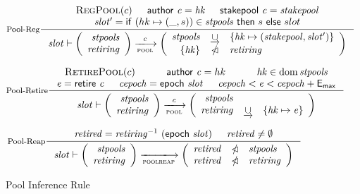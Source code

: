 \begin{figure}
  \begin{equation}\label{eq:pool-reg}
    \inference[Pool-Reg]
    {
      \RegPool{c}
      & \cauthor{c} = \var{hk}
      & \stakepool{c} = \var{stakepool}
      \\
      \var{slot'} = \mathsf{if}~(hk \mapsto (\_, s))\in\var{stpools}
                    ~\mathsf{then}~ s
                    ~\mathsf{else}~ slot
    }
    {
      \var{slot} \vdash
      \left(
      \begin{array}{r}
        \var{stpools} \\
        \var{retiring}
      \end{array}
      \right)
      \trans{pool}{c}
      \left(
      \begin{array}{rcl}
        \var{stpools} & \unionoverride
                      & \{\var{hk} \mapsto \var{(stakepool, slot')}\} \\
        \{\var{hk}\} & \subtractdom & \var{retiring} \\
      \end{array}
      \right)
    }
  \end{equation}


  \begin{equation}\label{eq:pool-ret}
    \inference[Pool-Retire]
    {
    \RetirePool{c}
    & \cauthor{c} = hk
    & \var{hk} \in \dom \var{stpools} \\
    \var{e} = \retire{c}
    & \var{cepoch} = \epoch{slot}
    & \var{cepoch} < \var{e} < \var{cepoch} + \emax
  }
  {
    \var{slot} \vdash
    \left(
      \begin{array}{r}
        \var{stpools} \\
        \var{retiring}
      \end{array}
    \right)
    \trans{pool}{c}
    \left(
      \begin{array}{rcl}
        \var{stpools} \\
        \var{retiring} & \unionoverride & \{\var{hk} \mapsto \var{e}\} \\
      \end{array}
    \right)
  }
  \end{equation}

  \begin{equation}\label{eq:pool-reap}
    \inference[Pool-Reap]
    {
      \var{retired} = \var{retiring}^{-1}~\var{(\epoch{slot})}
      & \var{retired} \neq \emptyset
    }
    {
      \var{slot} \vdash
      \left(
      \begin{array}{r}
        \var{stpools} \\
        \var{retiring}
      \end{array}
      \right)
      \trans{poolreap}{}
      \left(
      \begin{array}{rcl}
        \var{retired} & \subtractdom & \var{stpools} \\
        \var{retired} & \subtractdom & \var{retiring} \\
      \end{array}
      \right)
    }
  \end{equation}
  \caption{Pool Inference Rule}
  \label{fig:pool-rules}


\end{figure}

